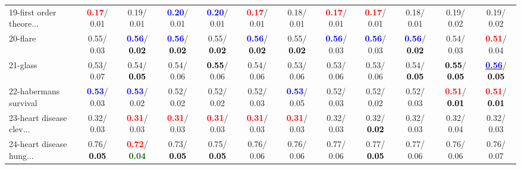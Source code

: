 \begin{table}[h]
\begin{center}
{\begin{tabular}{lc|c|c|c|c|c|c|c|c|c|c}
19-first order theore... & \textcolor{red}{\textbf{  0.17}}/  0.01 &   0.19/  0.01 & \textcolor{blue}{\textbf{  0.20}}/  0.01 & \textcolor{blue}{\textbf{  0.20}}/  0.01 & \textcolor{red}{\textbf{  0.17}}/  0.01 &   0.18/  0.01 & \textcolor{red}{\textbf{  0.17}}/  0.01 & \textcolor{red}{\textbf{  0.17}}/  0.01 &   0.18/  0.01 &   0.19/  0.02 &   0.19/  0.02 \\
20-flare &   0.55/  0.03 & \textcolor{blue}{\textbf{  0.56}}/\textcolor{black}{\textbf{  0.02}} & \textcolor{blue}{\textbf{  0.56}}/\textcolor{black}{\textbf{  0.02}} &   0.55/\textcolor{black}{\textbf{  0.02}} & \textcolor{blue}{\textbf{  0.56}}/\textcolor{black}{\textbf{  0.02}} &   0.55/\textcolor{black}{\textbf{  0.02}} & \textcolor{blue}{\textbf{  0.56}}/  0.03 & \textcolor{blue}{\textbf{  0.56}}/  0.03 & \textcolor{blue}{\textbf{  0.56}}/\textcolor{black}{\textbf{  0.02}} &   0.54/  0.03 & \textcolor{red}{\textbf{  0.51}}/  0.04 \\
21-glass &   0.53/  0.07 &   0.54/\textcolor{black}{\textbf{  0.05}} &   0.54/  0.06 & \textcolor{black}{\textbf{  0.55}}/  0.06 &   0.54/  0.06 &   0.53/  0.06 &   0.53/  0.06 &   0.53/  0.06 &   0.54/\textcolor{black}{\textbf{  0.05}} & \textcolor{black}{\textbf{  0.55}}/\textcolor{black}{\textbf{  0.05}} & \underline{\textcolor{blue}{\textbf{  0.56}}}/\textcolor{black}{\textbf{  0.05}} \\ \hline
22-habermans survival & \textcolor{blue}{\textbf{  0.53}}/  0.03 & \textcolor{blue}{\textbf{  0.53}}/  0.02 &   0.52/  0.02 &   0.52/  0.02 &   0.52/  0.03 & \textcolor{blue}{\textbf{  0.53}}/  0.05 &   0.52/  0.03 &   0.52/  0.02 &   0.52/  0.03 & \textcolor{red}{\textbf{  0.51}}/\textcolor{black}{\textbf{  0.01}} & \textcolor{red}{\textbf{  0.51}}/\textcolor{black}{\textbf{  0.01}} \\
23-heart disease clev... &   0.32/  0.03 & \textcolor{red}{\textbf{  0.31}}/  0.03 & \textcolor{red}{\textbf{  0.31}}/  0.03 & \textcolor{red}{\textbf{  0.31}}/  0.03 & \textcolor{red}{\textbf{  0.31}}/  0.03 & \textcolor{red}{\textbf{  0.31}}/  0.03 &   0.32/  0.03 &   0.32/\textcolor{black}{\textbf{  0.02}} &   0.32/  0.03 &   0.32/  0.04 &   0.32/  0.03 \\
24-heart disease hung... &   0.76/\textcolor{black}{\textbf{  0.05}} & \textcolor{red}{\textbf{  0.72}}/\textcolor{darkgreen}{\textbf{  0.04}} &   0.73/\textcolor{black}{\textbf{  0.05}} &   0.75/\textcolor{black}{\textbf{  0.05}} &   0.76/  0.06 &   0.76/  0.06 &   0.77/  0.06 &   0.77/\textcolor{black}{\textbf{  0.05}} &   0.77/  0.06 &   0.76/  0.06 &   0.76/  0.07 \\

\end{tabular}}
\end{center}
\end{table}
